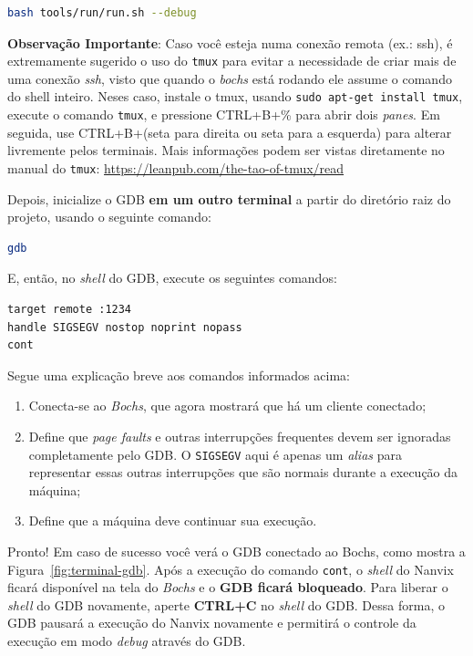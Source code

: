 \documentclass[11pt]{article}
\begin{document}
\begin{lstlisting}[language=bash,numbers=none,frame=single]
bash tools/run/run.sh --debug
\end{lstlisting}

\textbf{Observação Importante}: Caso você esteja numa conexão remota (ex.: ssh), é extremamente sugerido o uso do \texttt{tmux} para evitar a necessidade de criar mais de uma conexão \textit{ssh}, visto que quando o \textit{bochs} está rodando ele assume o comando do shell inteiro. Neses caso, instale o tmux, usando \texttt{sudo apt-get install tmux}, execute o comando \texttt{tmux}, e pressione CTRL+B+\% para abrir dois \textit{panes}. Em seguida, use CTRL+B+(seta para direita ou seta para a esquerda) para alterar livremente pelos terminais. Mais informações podem ser vistas diretamente no manual do \texttt{tmux}: \url{https://leanpub.com/the-tao-of-tmux/read}


Depois, inicialize o GDB \textbf{em um outro terminal} a partir do diretório raiz do projeto, usando o seguinte comando: \\

\begin{lstlisting}[language=bash,numbers=none,frame=single]
gdb
\end{lstlisting}

E, então, no \textit{shell} do GDB, execute os seguintes comandos:\\

\begin{lstlisting}[language=sh,numbers=none,frame=single]
target remote :1234
handle SIGSEGV nostop noprint nopass
cont
\end{lstlisting}

Segue uma explicação breve aos comandos informados acima:

\begin{enumerate}
	\item Conecta-se ao \textit{Bochs}, que agora mostrará que há um cliente conectado;
	\item Define que \textit{page faults} e outras interrupções frequentes devem ser ignoradas completamente pelo GDB. O \texttt{SIGSEGV} aqui é apenas um \textit{alias} para representar essas outras interrupções que são normais durante a execução da máquina;
	\item Define que a máquina deve continuar sua execução.
\end{enumerate}

Pronto! Em caso de sucesso você verá o GDB conectado ao Bochs, como mostra a Figura~\ref{fig:terminal-gdb}. Após a execução do comando \texttt{cont}, o \textit{shell} do Nanvix ficará disponível na tela do \textit{Bochs} e o \textbf{GDB ficará bloqueado}. Para liberar o \textit{shell} do GDB novamente, aperte \textbf{CTRL+C} no \textit{shell} do GDB. Dessa forma, o GDB pausará a execução do Nanvix novamente e permitirá o controle da execução em modo \textit{debug} através do GDB.
\end{document}

